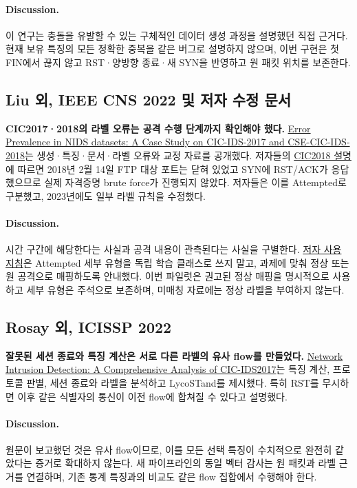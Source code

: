 \paragraph{Discussion.} 이 연구는 충돌을 유발할 수 있는 구체적인 데이터 생성 과정을 설명했던 직접 근거다. 현재 보유 특징의 모든 정확한 중복을 같은 버그로 설명하지 않으며, 이번 구현은 첫 FIN에서 끊지 않고 RST·양방향 종료·새 SYN을 반영하고 원 패킷 위치를 보존한다.

\subsection{Liu 외, IEEE CNS 2022 및 저자 수정 문서}
\textbf{CIC2017·2018의 라벨 오류는 공격 수행 단계까지 확인해야 했다.} \href{https://intrusion-detection.distrinet-research.be/CNS2022/index.html}{Error Prevalence in NIDS datasets: A Case Study on CIC-IDS-2017 and CSE-CIC-IDS-2018}는 생성·특징·문서·라벨 오류와 교정 자료를 공개했다. 저자들의 \href{https://intrusion-detection.distrinet-research.be/CNS2022/CSECICIDS2018.html}{CIC2018 설명}에 따르면 2018년 2월 14일 FTP 대상 포트는 닫혀 있었고 SYN에 RST/ACK가 응답했으므로 실제 자격증명 brute force가 진행되지 않았다. 저자들은 이를 Attempted로 구분했고, 2023년에도 일부 라벨 규칙을 수정했다.
\paragraph{Discussion.} 시간 구간에 해당한다는 사실과 공격 내용이 관측된다는 사실을 구별한다. \href{https://intrusion-detection.distrinet-research.be/CNS2022/Dataset_Download.html}{저자 사용 지침}은 Attempted 세부 유형을 독립 학습 클래스로 쓰지 말고, 과제에 맞춰 정상 또는 원 공격으로 매핑하도록 안내했다. 이번 파일럿은 권고된 정상 매핑을 명시적으로 사용하고 세부 유형은 주석으로 보존하며, 미매칭 자료에는 정상 라벨을 부여하지 않는다.

\subsection{Rosay 외, ICISSP 2022}
\textbf{잘못된 세션 종료와 특징 계산은 서로 다른 라벨의 유사 flow를 만들었다.} \href{https://www.scitepress.org/Papers/2022/107740/107740.pdf}{Network Intrusion Detection: A Comprehensive Analysis of CIC-IDS2017}는 특징 계산, 프로토콜 판별, 세션 종료와 라벨을 분석하고 LycoSTand를 제시했다. 특히 RST를 무시하면 이후 같은 식별자의 통신이 이전 flow에 합쳐질 수 있다고 설명했다.
\paragraph{Discussion.} 원문이 보고했던 것은 유사 flow이므로, 이를 모든 선택 특징이 수치적으로 완전히 같았다는 증거로 확대하지 않는다. 새 파이프라인의 동일 벡터 감사는 원 패킷과 라벨 근거를 연결하며, 기존 통계 특징과의 비교도 같은 flow 집합에서 수행해야 한다.

